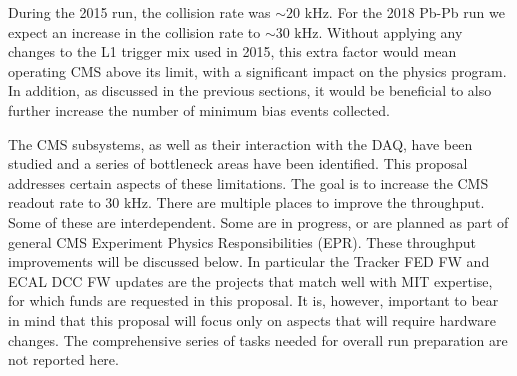 During the 2015 run, the collision rate was $\sim 20$ kHz. For the 2018 Pb-Pb run we expect an increase in the collision rate to $\sim 30$ kHz. Without applying any changes to the L1 trigger mix used in 2015, this extra factor would mean operating CMS above its limit, with a significant impact on the physics program. In addition, as discussed in the previous sections, it would be beneficial to also further increase the number of minimum bias events collected. 

The CMS subsystems, as well as their interaction with the DAQ, have been studied and a series of bottleneck areas have been identified. This proposal addresses certain aspects of these limitations. The goal is to increase the CMS readout rate to 30 kHz. There are multiple places to improve the throughput. Some of these are interdependent.  Some are in progress, or are planned as part of general CMS Experiment Physics Responsibilities (EPR). These throughput improvements will be discussed below. In particular the Tracker FED FW and ECAL DCC FW updates are the projects that match well with MIT expertise, for which funds are requested in this proposal.
It is, however, important to bear in mind that this proposal will focus only on aspects that will require hardware changes. The comprehensive series of tasks needed for overall run preparation are not reported here. 

